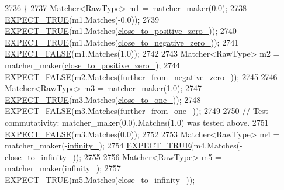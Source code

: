 \begin{DoxyCode}
2736                                                                            \{
2737     Matcher<RawType> m1 = matcher\_maker(0.0);
2738     \hyperlink{gtest_8h_ac33e7cdfb5d44a7a0f0ab552eb5c3c6a}{EXPECT\_TRUE}(m1.Matches(-0.0));
2739     \hyperlink{gtest_8h_ac33e7cdfb5d44a7a0f0ab552eb5c3c6a}{EXPECT\_TRUE}(m1.Matches(\hyperlink{classtesting_1_1gmock__matchers__test_1_1FloatingPointTest_a750555206ab9d5959d6dc84f8a760c57}{close\_to\_positive\_zero\_}));
2740     \hyperlink{gtest_8h_ac33e7cdfb5d44a7a0f0ab552eb5c3c6a}{EXPECT\_TRUE}(m1.Matches(\hyperlink{classtesting_1_1gmock__matchers__test_1_1FloatingPointTest_a641f5e223c25b6d6fb108b322acaa39d}{close\_to\_negative\_zero\_}));
2741     \hyperlink{gtest_8h_aeb6c7ae89f440c90c1a1815951c836da}{EXPECT\_FALSE}(m1.Matches(1.0));
2742 
2743     Matcher<RawType> m2 = matcher\_maker(\hyperlink{classtesting_1_1gmock__matchers__test_1_1FloatingPointTest_a750555206ab9d5959d6dc84f8a760c57}{close\_to\_positive\_zero\_});
2744     \hyperlink{gtest_8h_aeb6c7ae89f440c90c1a1815951c836da}{EXPECT\_FALSE}(m2.Matches(\hyperlink{classtesting_1_1gmock__matchers__test_1_1FloatingPointTest_acc020c4d830d9e9d910b92bb466d540f}{further\_from\_negative\_zero\_}));
2745 
2746     Matcher<RawType> m3 = matcher\_maker(1.0);
2747     \hyperlink{gtest_8h_ac33e7cdfb5d44a7a0f0ab552eb5c3c6a}{EXPECT\_TRUE}(m3.Matches(\hyperlink{classtesting_1_1gmock__matchers__test_1_1FloatingPointTest_a34c97dc5dc07ea62764de87fdd8b7764}{close\_to\_one\_}));
2748     \hyperlink{gtest_8h_aeb6c7ae89f440c90c1a1815951c836da}{EXPECT\_FALSE}(m3.Matches(\hyperlink{classtesting_1_1gmock__matchers__test_1_1FloatingPointTest_a049ba2d5d371e8aea6ada1ab5312b1bb}{further\_from\_one\_}));
2749 
2750     \textcolor{comment}{// Test commutativity: matcher\_maker(0.0).Matches(1.0) was tested above.}
2751     \hyperlink{gtest_8h_aeb6c7ae89f440c90c1a1815951c836da}{EXPECT\_FALSE}(m3.Matches(0.0));
2752 
2753     Matcher<RawType> m4 = matcher\_maker(-\hyperlink{classtesting_1_1gmock__matchers__test_1_1FloatingPointTest_a21d8a019a6365ddff80e301a6163f43f}{infinity\_});
2754     \hyperlink{gtest_8h_ac33e7cdfb5d44a7a0f0ab552eb5c3c6a}{EXPECT\_TRUE}(m4.Matches(-\hyperlink{classtesting_1_1gmock__matchers__test_1_1FloatingPointTest_a6fc8ac2030f4883e1c84da3a21bbb7c3}{close\_to\_infinity\_}));
2755 
2756     Matcher<RawType> m5 = matcher\_maker(\hyperlink{classtesting_1_1gmock__matchers__test_1_1FloatingPointTest_a21d8a019a6365ddff80e301a6163f43f}{infinity\_});
2757     \hyperlink{gtest_8h_ac33e7cdfb5d44a7a0f0ab552eb5c3c6a}{EXPECT\_TRUE}(m5.Matches(\hyperlink{classtesting_1_1gmock__matchers__test_1_1FloatingPointTest_a6fc8ac2030f4883e1c84da3a21bbb7c3}{close\_to\_infinity\_}));

\end{DoxyCode}
